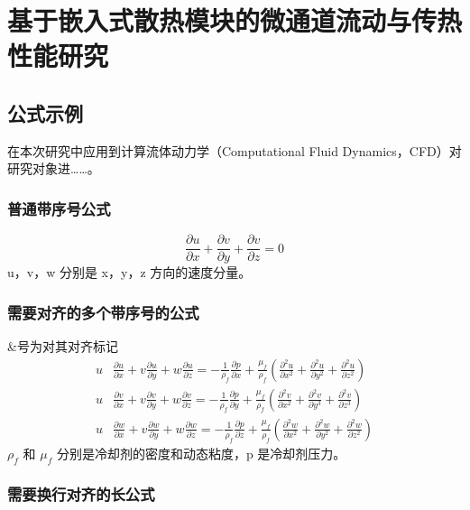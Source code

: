 
\chapter{基于嵌入式散热模块的微通道流动与传热性能研究}\label{ch:3}

\section{公式示例}
在本次研究中应用到计算流体动力学（Computational Fluid Dynamics，CFD）对研究对象进……。


\subsection{普通带序号公式}
\begin{equation}
    \frac{\partial u}{\partial x}+\frac{\partial v}{\partial y}+\frac{\partial v}{\partial z}=0
\end{equation}
u，v，w 分别是 x，y，z 方向的速度分量。


\subsection{需要对齐的多个带序号的公式}
\&号为对其对齐标记
\begin{align}%
    u & \frac{\partial u}{\partial x}+v \frac{\partial u}{\partial y}+w \frac{\partial u}{\partial z}=-\frac{1}{\rho_{f}} \frac{\partial p}{\partial x}+\frac{\mu_{f}}{\rho_{f}}\left(\frac{\partial^{2} u}{\partial x^{2}}+\frac{\partial^{2} u}{\partial y^{2}}+\frac{\partial^{2} u}{\partial z^{2}}\right) \\
    u & \frac{\partial v}{\partial x}+v \frac{\partial v}{\partial y}+w \frac{\partial v}{\partial z}=-\frac{1}{\rho_{f}} \frac{\partial p}{\partial y}+\frac{\mu_{f}}{\rho_{f}}\left(\frac{\partial^{2} v}{\partial x^{2}}+\frac{\partial^{2} v}{\partial y^{3}}+\frac{\partial^{2} v}{\partial z^{3}}\right) \\
    u & \frac{\partial w}{\partial x}+v \frac{\partial w}{\partial y}+w \frac{\partial w}{\partial z}=-\frac{1}{\rho_{f}} \frac{\partial p}{\partial z}+\frac{\mu_{f}}{\rho_{f}}\left(\frac{\partial^{2} w}{\partial x^{2}}+\frac{\partial^{2} w}{\partial y^{2}}+\frac{\partial^{2} w}{\partial z^{2}}\right)
\end{align}
$\rho_{f}$ 和 $\mu_{f}$ 分别是冷却剂的密度和动态粘度，p 是冷却剂压力。


\subsection{需要换行对齐的长公式}

